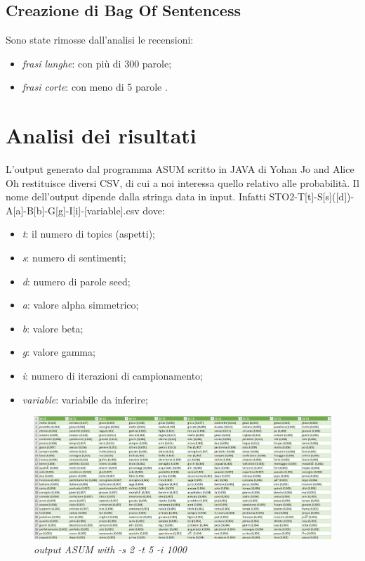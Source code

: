 \documentclass[a4paper,12pt]{article}
\begin{document}
\subsection{Creazione di Bag Of Sentencess}
Sono state rimosse dall’analisi le recensioni:
\begin{itemize}
	\item \textit{frasi lunghe}: con più di 300 parole;
	\item \textit{frasi corte}: con meno di 5 parole .
\end{itemize}

\newpage

\section{Analisi dei risultati}
L'output generato dal programma ASUM scritto in JAVA di Yohan Jo and Alice Oh restituisce diversi CSV, di cui a noi interessa quello relativo alle probabilità. Il nome dell'output dipende dalla stringa data in input. Infatti
STO2-T[t]-S[s]([d])-A[a]-B[b]-G[g]-I[i]-[variable].csv
dove:
\begin{itemize}
	\item \textit{t}: il numero di topics (aspetti);
	\item \textit{s}: numero di sentimenti;
	\item \textit{d}: numero di parole seed;
	\item \textit{a}: valore alpha simmetrico;
	\item \textit{b}: valore beta;
	\item \textit{g}: valore gamma;
	\item \textit{i}: numero di iterazioni di campionamento;
	\item \textit{variable}: variabile da inferire;
\end{itemize}

\begin{figure}[H]
	\centering
	\includegraphics[width=0.9\linewidth]{img/outputASUM.png}
	\caption{\textit{output ASUM with -s 2 -t 5 -i 1000}}
\end{figure}
\end{document}
